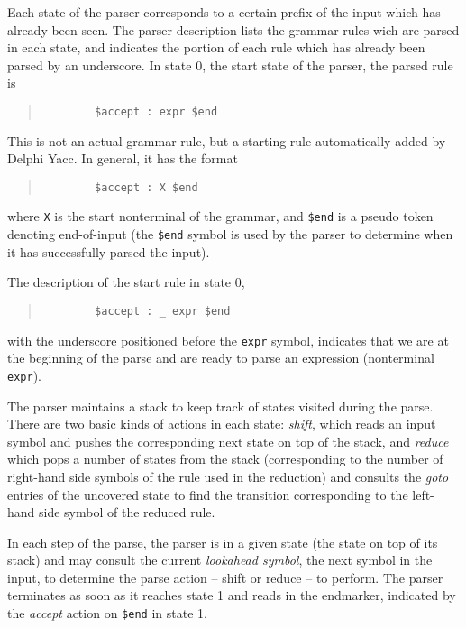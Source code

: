 \documentclass[a4paper]{article}
\begin{document}
Each state of the parser corresponds to a certain prefix of the input
which has already been seen. The parser description lists the grammar
rules wich are parsed in each state, and indicates the portion of each
rule which has already been parsed by an underscore. In state 0, the
start state of the parser, the parsed rule is
\begin{quote}\begin{verbatim}
        $accept : expr $end
\end{verbatim}\end{quote}

This is not an actual grammar rule, but a starting rule automatically
added by Delphi Yacc. In general, it has the format
\begin{quote}\begin{verbatim}
        $accept : X $end
\end{verbatim}\end{quote}
where \verb"X" is the start nonterminal of the grammar, and \verb"$end" is
a pseudo token denoting end-of-input (the \verb"$end" symbol is used by the
parser to determine when it has successfully parsed the input).

The description of the start rule in state 0,
\begin{quote}\begin{verbatim}
        $accept : _ expr $end
\end{verbatim}\end{quote}
with the underscore positioned before the \verb"expr" symbol, indicates that
we are at the beginning of the parse and are ready to parse an expression
(nonterminal \verb"expr").

The parser maintains a stack to keep track of states visited during the
parse. There are two basic kinds of actions in each state: {\em shift\/},
which reads an input symbol and pushes the corresponding next state on top of
the stack, and {\em reduce\/} which pops a number of states from the stack
(corresponding to the number of right-hand side symbols of the rule used
in the reduction) and consults the {\em goto\/} entries of the uncovered
state to find the transition corresponding to the left-hand side symbol of the
reduced rule.

In each step of the parse, the parser is in a given state (the state on
top of its stack) and may consult the current {\em lookahead symbol\/}, the
next symbol in the input, to determine the parse action -- shift or reduce --
to perform. The parser terminates as soon as it reaches state 1 and reads
in the endmarker, indicated by the {\em accept\/} action on \verb"$end" in
state 1.
\end{document}
